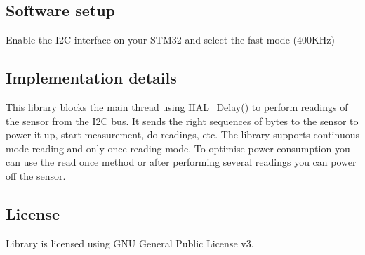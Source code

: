\subsection*{Software setup}

Enable the I2C interface on your S\+T\+M32 and select the fast mode (400\+K\+Hz)

\subsection*{Implementation details}

This library blocks the main thread using {\ttfamily H\+A\+L\+\_\+\+Delay()} to perform readings of the sensor from the I2C bus. It sends the right sequences of bytes to the sensor to power it up, start measurement, do readings, etc. The library supports continuous mode reading and only once reading mode. To optimise power consumption you can use the read once method or after performing several readings you can power off the sensor.

\subsection*{License}

Library is licensed using G\+NU General Public License v3. 